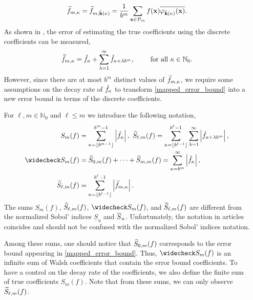 \[
\widetilde{f}_{m,\kappa}=\widetilde{f}_{m,\tilde{\boldsymbol{\mathbf{k}}}(\kappa)}=\frac{1}{b^m}\sum_{\boldsymbol{\mathbf{x}}\in\mathcal{P}_m}f(\boldsymbol{\mathbf{x}})\overline{\varphi_{\tilde{\boldsymbol{\mathbf{k}}}(\kappa)}(\boldsymbol{\mathbf{x}})}.
\]
As shown in \cite[Sec. 3]{HicJim}, the error of estimating the true coefficients using the discrete coefficients can be measured,
\begin{equation}\label{discrite_true_relationship}
\widetilde{f}_{m,\kappa} = \hat{f}_\kappa + \sum_{\lambda=1}^{\infty} \hat{f}_{\kappa + \lambda b^m}, \qquad \text{ for all } \kappa\in\mathbb{N}_0.
\end{equation}
However, since there are at most $b^m$ distinct values of $\widetilde{f}_{m,\kappa}$, we require some assumptions on the decay rate of $\hat{f}_{\kappa}$ to transform \eqref{mapped_error_bound} into a new error bound in terms of the discrete coefficients.

For $\ell,m \in \mathbb{N}_0$ and $\ell \le m$ we introduce the following notation,
\begin{align*}
S_m(f) &=  \sum_{\kappa=\left \lfloor b^{m-1} \right \rfloor}^{b^{m}-1} \absolute{\hf_{\kappa}}, \ 
\hS_{\ell,m}(f)  = \sum_{\kappa=\left \lfloor b^{\ell-1} \right \rfloor}^{b^{\ell}-1} \sum_{\lambda=1}^{\infty} \absolute{ \hf_{\kappa+\lambda b^{m}}}, \\
\wcS_m(f)&=\hS_{0,m}(f) + \cdots + \hS_{m,m}(f)=
\sum_{\kappa=b^{m}}^{\infty} \absolute{\hf_{\kappa}},\\ 
\tS_{\ell,m}(f) &= \sum_{\kappa=\left \lfloor b^{\ell-1}\right \rfloor}^{b^{\ell}-1} \absolute{\tf_{m,\kappa}}.
\end{align*}
The sums $S_m(f)$, $\widehat{S}_{\ell,m}(f)$, $\wcS_m(f)$, and $\widetilde{S}_{\ell,m}(f)$ are different from the normalized Sobol' indices $\underline{S}_u$ and $\ov{$S$}_u$. Unfortunately, the notation in articles \cite{HicJim,HicJimLi,JimHic} coincides and should not be confused with the normalized Sobol' indices notation.

Among these sums, one should notice that $\widehat{S}_{0,m}(f)$ corresponds to the error bound appearing in \eqref{mapped_error_bound}. Thus, $\wcS_m(f)$ is an infinite sum of Walsh coefficients that contain the error bound coefficients. To have a control on the decay rate of the coefficients, we also define the finite sum of true coefficients $S_m(f)$. Note that from these sums, we can only observe $\widetilde{S}_{\ell,m}(f)$.

